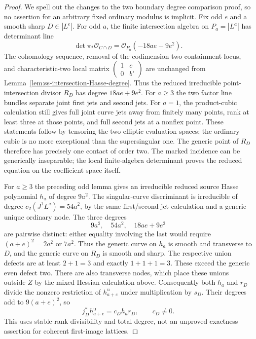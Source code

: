 \begin{proof}
We spell out the changes to the two boundary degree comparison
proof, so no assertion for an arbitrary fixed ordinary modulus
is implicit. Fix odd $e$ and a smooth sharp $D\in|L^e|$.
For odd $a$, the finite intersection algebra on $P_a=|L^a|$
has determinant line
\[
 \det\pi_*\mathcal O_{C\cap D}
       =\mathcal O_{P_a}(-18ae-9e^2).
\]
The cohomology sequence, removal of the codimension-two
containment locus, and characteristic-two local matrix
$\left(\begin{smallmatrix}1&c\\0&b'\end{smallmatrix}\right)$
are unchanged from Lemma~\ref{lem:ss-intersection-Hasse-degree}.
Thus the reduced irreducible point-intersection divisor
$R_D$ has degree $18ae+9e^2$. For $a\ge3$ the two factor
line bundles separate joint first jets and second jets.
For $a=1$, the product-cubic calculation still gives full
joint curve jets away from finitely many points, rank at
least three at those points, and full second jets at a
nonflex point. These statements follow by tensoring the two
elliptic evaluation spaces; the ordinary cubic is no more
exceptional than the supersingular one. The generic point
of $R_D$ therefore has precisely one contact of order two.
The marked incidence can be generically inseparable; the
local finite-algebra determinant proves the reduced equation
on the coefficient space itself.

For $a\ge3$ the preceding odd lemma gives an irreducible
reduced source Hasse polynomial $h_a$ of degree $9a^2$.
The singular-curve discriminant is irreducible of degree
$c_2(J^1L^a)=54a^2$, by the same first/second-jet calculation
and a generic unique ordinary node. The three degrees
\[
 9a^2,\quad54a^2,\quad18ae+9e^2
\]
are pairwise distinct: either equality involving the last
would require $(a+e)^2=2a^2$ or $7a^2$.
Thus the generic curve on $h_a$ is smooth and transverse
to $D$, and the generic curve on $R_D$ is smooth and sharp.
The respective union defects are at least $2+1=3$ and
exactly $1+1+1=3$. These exceed the generic even defect two.
There are also transverse nodes, which place these unions
outside $Z$ by the mixed-Hessian calculation above.
Consequently both $h_a$ and $r_D$ divide the nonzero restriction
of $h_{a+e}^{\mathrm u}$ under multiplication by $s_D$.
Their degrees add to $9(a+e)^2$, so
\[
                  j_D^*h_{a+e}^{\mathrm u}=c_D h_a r_D,
                  \qquad c_D\ne0.
\]
This uses stable-rank divisibility and total degree, not an
unproved exactness assertion for coherent first-image lattices.


\end{proof}
